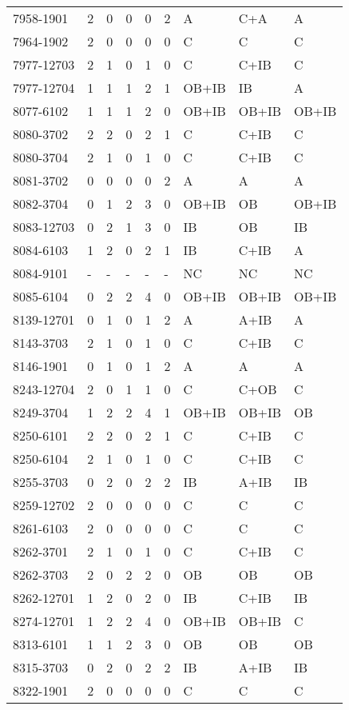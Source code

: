 \begin{longtable}{p{2.1cm}p{0.8cm}p{0.8cm}p{0.8cm}p{0.8cm}p{0.8cm}p{1.5cm}p{1.5cm}p{1.2cm}}
7958-1901 & 2 & 0 & 0 & 0 & 2 & A & C+A & A \\
7964-1902 & 2 & 0 & 0 & 0 & 0 & C & C & C \\
7977-12703 & 2 & 1 & 0 & 1 & 0 & C & C+IB & C \\
7977-12704 & 1 & 1 & 1 & 2 & 1 & OB+IB & IB & A \\
8077-6102 & 1 & 1 & 1 & 2 & 0 & OB+IB & OB+IB & OB+IB \\
8080-3702 & 2 & 2 & 0 & 2 & 1 & C & C+IB & C \\
8080-3704 & 2 & 1 & 0 & 1 & 0 & C & C+IB & C \\
8081-3702 & 0 & 0 & 0 & 0 & 2 & A & A & A \\
8082-3704 & 0 & 1 & 2 & 3 & 0 & OB+IB & OB & OB+IB \\
8083-12703 & 0 & 2 & 1 & 3 & 0 & IB & OB & IB \\
8084-6103 & 1 & 2 & 0 & 2 & 1 & IB & C+IB & A \\
8084-9101 & - & - & - & - & - & NC & NC & NC \\
8085-6104 & 0 & 2 & 2 & 4 & 0 & OB+IB & OB+IB & OB+IB \\
8139-12701 & 0 & 1 & 0 & 1 & 2 & A & A+IB & A \\
8143-3703 & 2 & 1 & 0 & 1 & 0 & C & C+IB & C \\
8146-1901 & 0 & 1 & 0 & 1 & 2 & A & A & A \\
8243-12704 & 2 & 0 & 1 & 1 & 0 & C & C+OB & C \\
8249-3704 & 1 & 2 & 2 & 4 & 1 & OB+IB & OB+IB & OB \\
8250-6101 & 2 & 2 & 0 & 2 & 1 & C & C+IB & C \\
8250-6104 & 2 & 1 & 0 & 1 & 0 & C & C+IB & C \\
8255-3703 & 0 & 2 & 0 & 2 & 2 & IB & A+IB & IB \\
8259-12702 & 2 & 0 & 0 & 0 & 0 & C & C & C \\
8261-6103 & 2 & 0 & 0 & 0 & 0 & C & C & C \\
8262-3701 & 2 & 1 & 0 & 1 & 0 & C & C+IB & C \\
8262-3703 & 2 & 0 & 2 & 2 & 0 & OB & OB & OB \\
8262-12701 & 1 & 2 & 0 & 2 & 0 & IB & C+IB & IB \\
8274-12701 & 1 & 2 & 2 & 4 & 0 & OB+IB & OB+IB & C \\
8313-6101 & 1 & 1 & 2 & 3 & 0 & OB & OB & OB \\
8315-3703 & 0 & 2 & 0 & 2 & 2 & IB & A+IB & IB \\
8322-1901 & 2 & 0 & 0 & 0 & 0 & C & C & C \\

\end{longtable}
